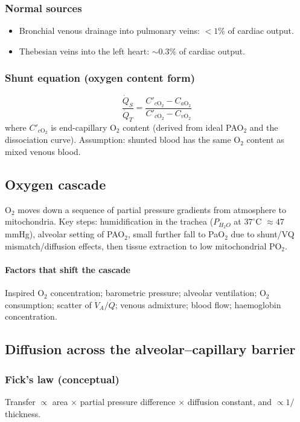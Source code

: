 \documentclass[11pt,a4paper]{article}
\begin{document}
\subsubsection{Normal sources}
\begin{itemize}
  \item Bronchial venous drainage into pulmonary veins: \(<1\%\) of cardiac output.
  \item Thebesian veins into the left heart: \(\sim 0.3\%\) of cardiac output.
\end{itemize}

\subsubsection{Shunt equation (oxygen content form)}
\[
\frac{\dot Q_S}{\dot Q_T} = \frac{C'_{c\mathrm{O}_2} - C_{a\mathrm{O}_2}}{C'_{c\mathrm{O}_2} - C_{v\mathrm{O}_2}}
\]
where \(C'_{c\mathrm{O}_2}\) is end-capillary O$_2$ content (derived from ideal PAO$_2$ and the dissociation curve). Assumption: shunted blood has the same O$_2$ content as mixed venous blood.

\subsection{Oxygen cascade}
O$_2$ moves down a sequence of partial pressure gradients from atmosphere to mitochondria.
Key steps: humidification in the trachea (\(P_{H_2O}\) at \(37^\circ\)C \(\approx 47\) mmHg), alveolar setting of PAO$_2$, small further fall to PaO$_2$ due to shunt/VQ mismatch/diffusion effects, then tissue extraction to low mitochondrial PO$_2$.

\paragraph{Factors that shift the cascade}
Inspired O$_2$ concentration; barometric pressure; alveolar ventilation; O$_2$ consumption; scatter of \(\dot V_A/\dot Q\); venous admixture; blood flow; haemoglobin concentration.

\subsection{Diffusion across the alveolar--capillary barrier}
\subsubsection{Fick's law (conceptual)}
Transfer \(\propto\) area \(\times\) partial pressure difference \(\times\) diffusion constant, and \(\propto 1/\)thickness.
\end{document}
